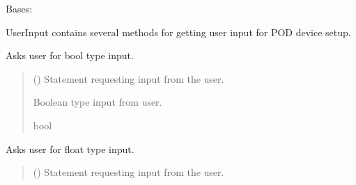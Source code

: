 \documentclass[letterpaper,10pt,english]{sphinxmanual}
\begin{document}
\begin{fulllineitems}
\label{\detokenize{GetUserInput:GetUserInput.UserInput}}
\pysigstartsignatures
{}
\pysigstopsignatures
\sphinxAtStartPar
Bases: 

\sphinxAtStartPar
UserInput contains several methods for getting user input for POD device setup.

\begin{fulllineitems}
\label{\detokenize{GetUserInput:GetUserInput.UserInput.AskForBool}}
\pysigstartsignatures
{}
\pysigstopsignatures
\sphinxAtStartPar
Asks user for bool type input.
\begin{quote}\begin{description}
\sphinxAtStartPar
{} () \textendash{} Statement requesting input from the user.

\sphinxAtStartPar
Boolean type input from user.

\sphinxAtStartPar
bool

\end{description}\end{quote}

\end{fulllineitems}


\begin{fulllineitems}
\label{\detokenize{GetUserInput:GetUserInput.UserInput.AskForFloat}}
\pysigstartsignatures
{}
\pysigstopsignatures
\sphinxAtStartPar
Asks user for float type input.
\begin{quote}\begin{description}
\sphinxAtStartPar
{} () \textendash{} Statement requesting input from the user.


\end{description}
\end{quote}
\end{fulllineitems}
\end{fulllineitems}
\end{document}
